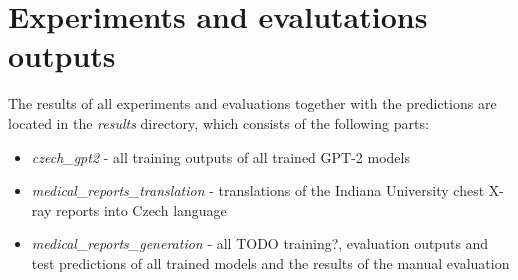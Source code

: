 \documentclass[12pt,a4paper]{report}
\let\openright=\clearpage
\begin{document}
\section{Experiments and evalutations outputs}
\label{add:Outputs}
The results of all experiments and evaluations together with the predictions are located in the \textit{results} directory, which consists of the following parts:
\begin{itemize}
	\item \textit{czech\_gpt2} - all training outputs of all trained GPT-2 models
	\item \textit{medical\_reports\_translation} - translations of the Indiana University chest X-ray reports into Czech language
	\item \textit{medical\_reports\_generation} - all TODO training?, evaluation outputs and test predictions of all trained models and the results of the manual evaluation
\end{itemize}

\openright
\end{document}
